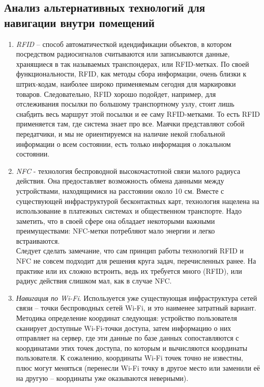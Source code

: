 \subsection{Анализ альтернативных технологий для навигации внутри помещений}

\begin{enumerate}
    \item
    \textit{RFID} – способ автоматичесткой идендификации объектов, в котором посредством радиосигналов считываются или записываются данные, хранящиеся в так называемых транспондерах, или RFID-метках. По своей функциональности, RFID, как методы сбора информации, очень близки к штрих-кодам, наиболее широко применяемым сегодня для маркировки товаров. Следовательно, RFID хорошо подойдет, например, для отслеживания посылки по большому транспортному узлу, стоит лишь снабдить весь маршрут этой посылки и ее саму RFID-метками. То есть RFID применяется там, где система знает про все. Маячки представляют собой передатчики, и мы не ориентируемся на наличие некой глобальной информации о всем состоянии, есть только информация о локальном состоянии.
    \item
    \textit{NFC} - технология беспроводной высокочастотной связи малого радиуса действия. Она предоставляет возможность обмена данными между устройствами, находящимися на расстоянии около 10 см. Вместе с существующей инфраструктурой бесконтактных карт, технология нацелена на использование в платежных системах и общественном транспорте. Надо заметить, что в своей сфере она обладает некоторыми важными преимуществами: NFC-метки потребляют мало энергии и легко встраиваются. \\ 
    Следует сделать замечание, что сам принцип работы технологий RFID и NFC не совсем подходит для решения круга задач, перечисленных ранее. На практике или их сложно встроить, ведь их требуется много (RFID), или радиус действия слишком мал, как в случае NFC.
    \item
    \textit{Навигация по Wi-Fi}. Используется уже существующая инфраструктура сетей связи – точки беспроводных сетей Wi-Fi, и это наименее затратный вариант. Методика определение координат следующая: устройство пользователя сканирует доступные Wi-Fi-точки доступа, затем информацию о них отправляет на сервер, где эти данные по базе данных сопоставляются с координатами этих точек доступа, по которым и вычисляются координаты пользователя. К сожалению, координаты Wi-Fi точек точно не известны, плюс могут меняться (перенесли Wi-Fi точку в другое место или заменили её на другую – координаты уже оказываются неверными). \\

\end{enumerate}
